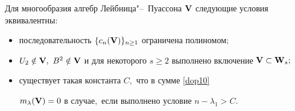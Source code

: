 \begin{theorem}

Для многообразия алгебр Лейбница"--~Пуассона ${\bf V}$ следующие условия эквивалентны\/$:$



\begin{itemize}



\item[\rm (i)] последовательность $\{c_n({\bf V})\}_{n\geq 1}$ ограничена полиномом\/$;$



\item[\rm (ii)] $U_2 \notin {\bf V},$ $B^2 \notin {\bf V}$ и для некоторого $s\geq 2$ выполнено включение ${\bf V} \subset {\bf W}_s;$



\item[\rm (iii)] существует такая константа $C,$ что в сумме \eqref{dop10}

 $m_\lambda({\bf V}) = 0$ в случае$,$ если выполнено условие $n -\lambda_1 > C.$

\end{itemize}



\end{theorem}





